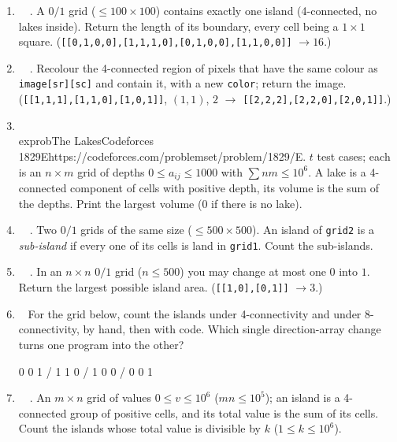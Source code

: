 \exlegend
\begin{enumerate}[leftmargin=*, label=\textbf{E3.\arabic*}, itemsep=6pt]
    \item \exeasy\ \pconcept {}\ . A $0/1$ grid ($\le 100\times100$) contains exactly one island (4-connected, no lakes inside). Return the length of its boundary, every cell being a $1\times1$ square. (\texttt{[[0,1,0,0],[1,1,1,0],[0,1,0,0],[1,1,0,0]]} $\to 16$.)
    \item \exeasy\ \ptricky {}\ . Recolour the 4-connected region of pixels that have the same colour as \texttt{image[sr][sc]} and contain it, with a new \texttt{color}; return the image. (\texttt{[[1,1,1],[1,1,0],[1,0,1]]}, $(1,1)$, $2$ $\to$ \texttt{[[2,2,2],[2,2,0],[2,0,1]]}.)
    \item \exeasy\ \pconcept {}\\exprob{The Lakes}{Codeforces 1829E}{https://codeforces.com/problemset/problem/1829/E}. $t$ test cases; each is an $n\times m$ grid of depths $0 \le a_{ij} \le 1000$ with $\sum nm \le 10^6$. A lake is a 4-connected component of cells with positive depth, its volume is the sum of the depths. Print the largest volume (0 if there is no lake).
    \item \exmedium\ \ptricky {}\ . Two $0/1$ grids of the same size ($\le 500\times500$). An island of \texttt{grid2} is a \emph{sub-island} if every one of its cells is land in \texttt{grid1}. Count the sub-islands.
    \item \exhard\ \pclassic {}\ . In an $n\times n$ $0/1$ grid ($n \le 500$) you may change at most one $0$ into $1$. Return the largest possible island area. (\texttt{[[1,0],[0,1]]} $\to 3$.)
    \item \exmedium\ \pconcept {} For the grid below, count the islands under 4-connectivity and under 8-connectivity, by hand, then with code. Which single direction-array change turns one program into the other?
    \begin{center} 0 0 1 \quad /  1 1 0 \quad /  1 0 0 \quad /  0 0 1\end{center}
    \item \exmedium\ \precent {}\ . An $m\times n$ grid of values $0 \le v \le 10^6$ ($mn \le 10^5$); an island is a 4-connected group of positive cells, and its total value is the sum of its cells. Count the islands whose total value is divisible by $k$ ($1 \le k \le 10^6$).
\end{enumerate}

